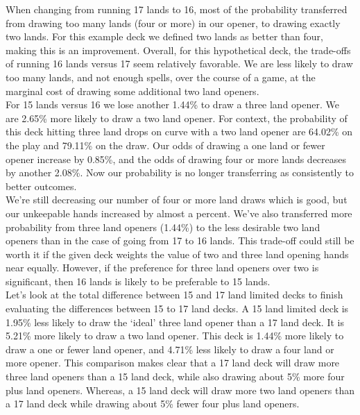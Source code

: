 \documentclass[oneside]{book}   %
\begin{document}
When changing from running 17 lands to 16, most of the probability transferred from drawing too many lands (four or more) in our opener, to drawing exactly two lands. For this example deck we defined two lands as better than four, making this is an improvement. Overall, for this hypothetical deck, the trade-offs of running 16 lands versus 17 seem relatively favorable. We are less likely to draw too many lands, and not enough spells, over the course of a game, at the marginal cost of drawing some additional two land openers.\\

For 15 lands versus 16 we lose another 1.44\% to draw a three land opener. We are 2.65\% more likely to draw a two land opener. For context, the probability of this deck hitting three land drops on curve with a two land opener are 64.02\% on the play and 79.11\% on the draw. Our odds of drawing a one land or fewer opener increase by 0.85\%, and the odds of drawing four or more lands decreases by another 2.08\%. Now our probability is no longer transferring as consistently to better outcomes. \\

We're still decreasing our number of four or more land draws which is good, but our unkeepable hands increased by almost a percent. We've also transferred more probability from three land openers (1.44\%) to the less desirable two land openers than in the case of going from 17 to 16 lands. This trade-off could still be worth it if the given deck weights the value of two and three land opening hands near equally. However, if the preference for three land openers over two is significant, then 16 lands is likely to be preferable to 15 lands.\\

Let's look at the total difference between 15 and 17 land limited decks to finish evaluating the differences between 15 to 17 land decks. A 15 land limited deck is 1.95\% less likely to draw the `ideal' three land opener than a 17 land deck. It is 5.21\% more likely to draw a two land opener. This deck is 1.44\% more likely to draw a one or fewer land opener, and 4.71\% less likely to draw a four land or more opener. This comparison makes clear that a 17 land deck will draw more three land openers than a 15 land deck, while also drawing about 5\% more four plus land openers. Whereas, a 15 land deck will draw more two land openers than a 17 land deck while drawing about 5\% fewer four plus land openers. \\
\end{document}
